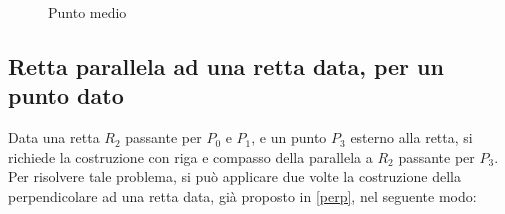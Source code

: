 \begin{figure}[!h]
\begin{center}
\caption{Punto medio}
\end{center}
\end{figure} 


\subsection{Retta parallela ad una retta data, per un punto dato} \label{parall}
Data una retta $R_{2}$ passante per $P_{0}$ e $P_{1}$, e un punto $P_{3}$ esterno alla retta, si richiede la costruzione con riga e compasso della parallela a $R_{2}$ passante per $P_{3}$. Per risolvere tale problema, si può applicare due volte la costruzione della perpendicolare ad una retta data, già proposto in \ref{perp}, nel seguente modo:

